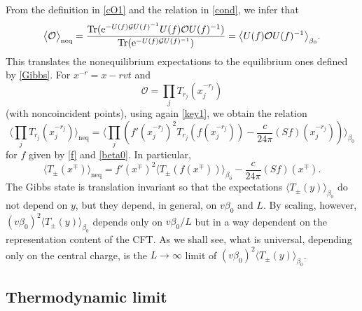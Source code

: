 \documentclass[12pt,a4paper]{article}
\newcommand{\ee}{{\rm e}}
\newcommand{\cG}{\mathcal{G}}
\newcommand{\cO}{\mathcal{O}}
\def\Tr{\operatorname{Tr}}
\theoremstyle{definition}
\theoremstyle{remark}
\begin{document}
From the definition in \eqref{cO1} and the relation in \eqref{cond}, we infer that
%
\begin{equation}
\big\langle\cO\big\rangle_{\text{neq}} =
\frac{\Tr(\ee^{-U(f)\cG U(f)^{-1}}U(f)\cO U(f)^{-1})}{\Tr(\ee^{-U(f)\cG U(f)^{-1}})}=
\big\langle U(f)\cO U(f)^{-1}\big\rangle_{\beta_0}.
\label{transl}
\end{equation}  
%
This translates the nonequilibrium expectations to the equilibrium ones
defined by \eqref{Gibbs}. For $x^{-r}= x-rvt$ and
%
\begin{equation}
\label{Tpms}  
\cO = \prod_{j}T_{r_j}(x_j^{-r_j})
\end{equation}  
%
(with noncoincident points), using again \eqref{key1}, we obtain the relation
%
\begin{equation}
\label{neqexp}  
\Big\langle \prod_{j} T_{r_j}(x_j^{-r_j}) \Big\rangle_{\text{neq}}
= \Big\langle
\prod_{j} \left( f'(x_j^{-r_j})^2T_{r_j}(f(x_j^{-r_j}))
- \frac{c}{24\pi}(Sf)(x_j^{-r_j}) \right)
	\Big\rangle_{\beta_0}
\end{equation}
%
for $f$ given by \eqref{f} and \eqref{beta0}.
In particular,
%
\begin{equation}
\label{exp1pt}  
\big\langle T_{\pm}(x^\mp)\big\rangle_{\text{neq}}
= f'(x^\mp)^2\big\langle T_{\pm}(f(x^\mp))\big\rangle_{\beta_0}
	- \frac{c}{24\pi} (Sf)(x^\mp).
\end{equation}
%
The Gibbs state is translation invariant so that the expectations $\big\langle T_{\pm}(y)\big\rangle_{\beta_0}$ do not depend on $y$, but they depend,
in general, on $v\beta_0$ and $L$.
By scaling, however, $(v\beta_0)^2 \big\langle T_{\pm}(y) \big\rangle_{\beta_0}$
depends only on $v\beta_0/L$ but in a way dependent on the representation
content of the CFT. As we shall see, what is universal, depending only on
the central charge, is the $L\to\infty$ limit of $(v\beta_0)^2
\big\langle T_{\pm}(y)\big\rangle_{\beta_0}$.


\subsection{Thermodynamic limit}
\label{subsec:3.3}
\end{document}
